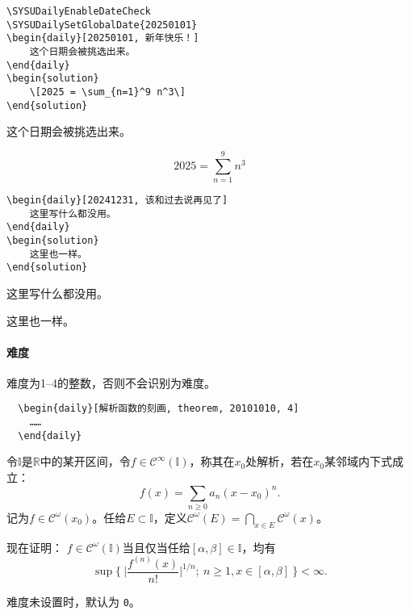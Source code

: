 \documentclass{SYSUDaily}
\begin{document}
\begin{multicols}{2}
	\begin{lstlisting}
\SYSUDailyEnableDateCheck
\SYSUDailySetGlobalDate{20250101}
\begin{daily}[20250101, 新年快乐！]
	这个日期会被挑选出来。
\end{daily}
\begin{solution}
	\[2025 = \sum_{n=1}^9 n^3\]
\end{solution}
\end{lstlisting}
	\small
	\SYSUDailyEnableDateCheck{}
	\begin{daily}[20250101, 新年快乐！]
		这个日期会被挑选出来。
	\end{daily}
	\begin{solution}
		\[2025 = \sum_{n=1}^9 n^3\]
	\end{solution}
\end{multicols}

\begin{multicols}{2}
	\begin{lstlisting}
\begin{daily}[20241231, 该和过去说再见了]
	这里写什么都没用。
\end{daily}
\begin{solution}
	这里也一样。
\end{solution}
\end{lstlisting}
	\small
	\begin{daily}[20241231, 该和过去说再见了]
		这里写什么都没用。
	\end{daily}
	\begin{solution}
		这里也一样。
	\end{solution}
	\vspace*{3cm}
\end{multicols}
\SYSUDailyDisableDateCheck
\paragraph{难度}
难度为1--4的整数，否则不会识别为难度。
\begin{lstlisting}
  \begin{daily}[解析函数的刻画, theorem, 20101010, 4]
    ……
  \end{daily}
\end{lstlisting}
\begin{daily}
	令$\mathbb I$是$\mathbb R$中的某开区间，令$f\in \mathscr{C}^\infty(\mathbb  I)$，称其在$x_0$处解析，若在$x_0$某邻域内下式成立：
	\[
		f(x) = \sum_{n\geqslant0} a_n(x-x_0)^n.
	\]
	记为$f\in \mathscr{C}^\omega(x_0)$。任给$E\subset \mathbb I$，定义$\mathscr{C}^\omega(E)=\bigcap_{x\in E}\mathscr{C}^\omega(x)$。

	现在证明：
	$f\in \mathscr{C}^\omega(\mathbb I)$当且仅当任给$[\alpha,\beta]\in \mathbb I$，均有
	\[
		\sup\biggl\{~\biggl| \frac{f^{(n)}(x)}{n!} \biggr|^{1/n}\!;~n\geqslant 1, x\in [\alpha,\beta] ~\biggr\}   <\infty.
	\]
\end{daily}
难度未设置时，默认为 \verb|0|。
\end{document}
